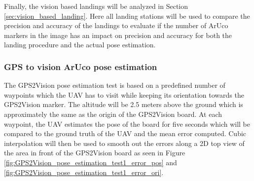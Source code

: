 \documentclass[../Head/report.tex]{subfiles}
\begin{document}
Finally, the vision based landings will be analyzed in Section \ref{sec:vision_based_landing}. Here all landing stations will be used to compare the precision and accuracy of the landings to evaluate if the number of ArUco markers in the image has an impact on precision and accuracy for both the landing procedure and the actual pose estimation.

\subsubsection{GPS to vision ArUco pose estimation}
\label{sec:GPS2Vision_pose_estimation}

The GPS2Vision pose estimation test is based on a predefined number of waypoints which the UAV has to visit while keeping its orientation towards the GPS2Vision marker. The altitude will be 2.5 meters above the ground which is approximately the same as the origin of the GPS2Vision board. At each waypoint, the UAV estimates the pose of the board for five seconds which will be compared to the ground truth of the UAV and the mean error computed. Cubic interpolation will then be used to smooth out the errors along a 2D top view of the area in front of the GPS2Vision board as seen in Figure \ref{fig:GPS2Vision_pose_estimation_test1_error_pos} and \ref{fig:GPS2Vision_pose_estimation_test1_error_ori}. 
\end{document}
